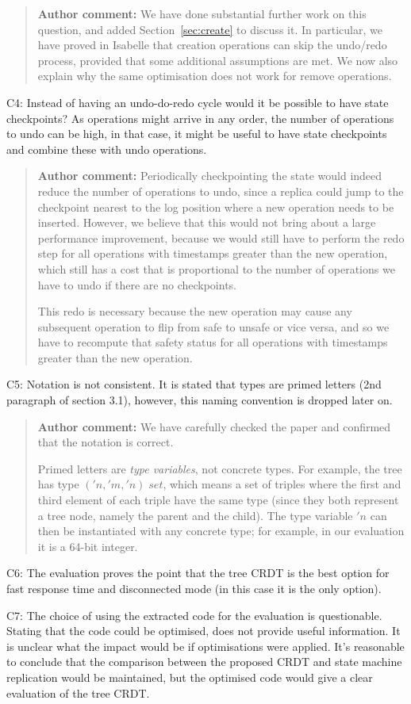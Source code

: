 \documentclass[10pt]{article}
\newcommand{\authorcomment}[1]{\begin{quote}\textbf{Author comment:} #1\end{quote}}
\begin{document}
\authorcomment{We have done substantial further work on this question, and added Section~\ref{sec:create} to discuss it.
In particular, we have proved in Isabelle that creation operations can skip the undo/redo process, provided that some additional assumptions are met.
We now also explain why the same optimisation does not work for remove operations.}
\begin{spverbatim}
C4: Instead of having an undo-do-redo cycle would it be possible to have state checkpoints? As operations might arrive in any order, the number of operations to undo can be high, in that case, it might be useful to have state checkpoints and combine these with undo operations.
\end{spverbatim}
\authorcomment{Periodically checkpointing the state would indeed reduce the number of operations to undo, since a replica could jump to the checkpoint nearest to the log position where a new operation needs to be inserted.
However, we believe that this would not bring about a large performance improvement, because we would still have to perform the redo step for all operations with timestamps greater than the new operation, which still has a cost that is proportional to the number of operations we have to undo if there are no checkpoints.

This redo is necessary because the new operation may cause any subsequent operation to flip from safe to unsafe or vice versa, and so we have to recompute that safety status for all operations with timestamps greater than the new operation.}
\begin{spverbatim}
C5: Notation is not consistent. It is stated that types are primed letters (2nd paragraph of section 3.1), however, this naming convention is dropped later on.
\end{spverbatim}
\authorcomment{We have carefully checked the paper and confirmed that the notation is correct.

Primed letters are \emph{type variables}, not concrete types.
For example, the tree has type $('n, '\!m, '\!n)\;\mathit{set}$, which means a set of triples where the first and third element of each triple have the same type (since they both represent a tree node, namely the parent and the child). 
The type variable $'n$ can then be instantiated with any concrete type; for example, in our evaluation it is a 64-bit integer.}
\begin{spverbatim}
C6: The evaluation proves the point that the tree CRDT is the best option for fast response time and disconnected mode (in this case it is the only option).

C7: The choice of using the extracted code for the evaluation is questionable. Stating that the code could be optimised, does not provide useful information. It is unclear what the impact would be if optimisations were applied. It's reasonable to conclude that the comparison between the proposed CRDT and state machine replication would be maintained, but the optimised code would give a clear evaluation of the tree CRDT.
\end{spverbatim}
\end{document}
